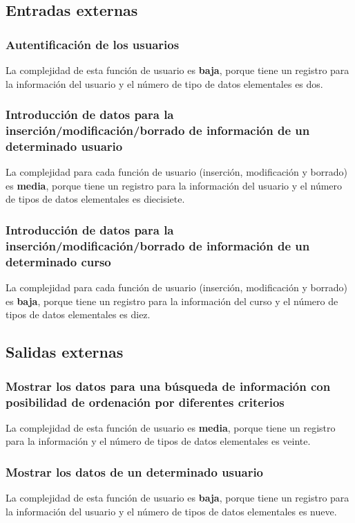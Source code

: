\documentclass[11pt,a4paper,spanish,twoside]{book}
\begin{document}
\subsection{Entradas externas}
\subsubsection{Autentificación de los usuarios}
La complejidad de esta función de usuario es \textbf{baja}, porque tiene un
registro para la información del usuario y el número de tipo de datos
elementales es dos. 

\subsubsection{Introducción de datos para la inserción/modificación/borrado 
  de información de un determinado usuario}
La complejidad para cada función de usuario (inserción, modificación y
borrado) es \textbf{media}, porque tiene un registro para la información del
usuario y el número de tipos de datos elementales es diecisiete.

\subsubsection{Introducción de datos para la inserción/modificación/borrado 
  de información de un determinado curso}
La complejidad para cada función de usuario (inserción, modificación y
borrado) es \textbf{baja}, porque tiene un registro para la información del
curso y el número de tipos de datos elementales es diez.

\subsection{Salidas externas}
\subsubsection{Mostrar los datos para una búsqueda de información con
  posibilidad de ordenación por diferentes criterios}
La complejidad de esta función de usuario es \textbf{media}, porque tiene un
registro para la información y el número de tipos de datos elementales es veinte.

\subsubsection{Mostrar los datos de un determinado usuario}
La complejidad de esta función de usuario es \textbf{baja}, porque tiene un
registro para la información del usuario y el número de tipos de datos
elementales es nueve.
\end{document}
